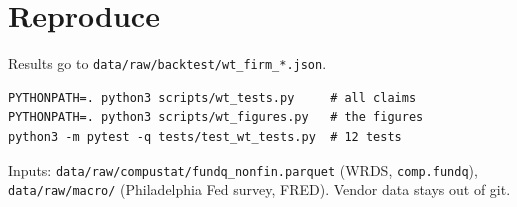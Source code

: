 \documentclass[11pt,a4paper]{article}
\newcommand{\code}[1]{\texttt{\small #1}}
\begin{document}
\section*{Reproduce}
Results go to \code{data/raw/backtest/wt\_firm\_*.json}.
\begin{verbatim}
PYTHONPATH=. python3 scripts/wt_tests.py     # all claims
PYTHONPATH=. python3 scripts/wt_figures.py   # the figures
python3 -m pytest -q tests/test_wt_tests.py  # 12 tests
\end{verbatim}
Inputs: \code{data/raw/compustat/fundq\_nonfin.parquet} (WRDS, \code{comp.fundq}), \code{data/raw/macro/} (Philadelphia Fed survey, FRED). Vendor data stays out of git.
\end{document}
